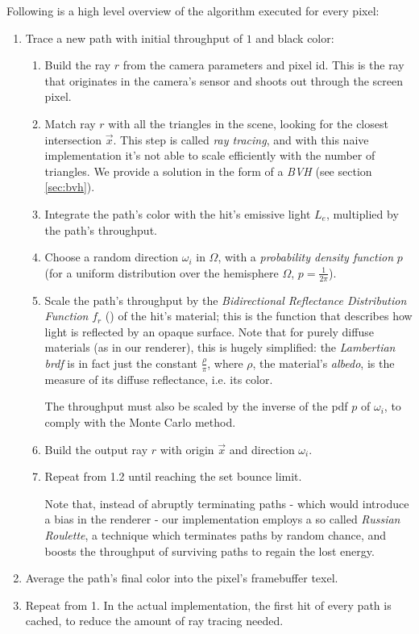 \documentclass[12pt,a4paper]{article}
\begin{document}
Following is a high level overview of the algorithm executed for every pixel:
\begin{enumerate}
\item Trace a new path with initial throughput of $1$ and black color:
    \begin{enumerate}
    \item Build the ray $r$ from the camera parameters and pixel id. This is the ray that originates in the camera's sensor and shoots out through the screen pixel.
    \item Match ray $r$ with all the triangles in the scene, looking for the closest intersection $\Vec{x}$. This step is called \textit{ray tracing}, and with this naive implementation it's not able to scale efficiently with the number of triangles. We provide a solution in the form of a \textit{BVH} (see section \ref{sec:bvh}).
    \item Integrate the path's color with the hit's emissive light $L_e$, multiplied by the path's throughput.
    \item Choose a random direction $\omega_i$ in $\Omega$, with a \textit{probability density function} $p$ (for a uniform distribution over the hemisphere $\Omega$, $p=\frac{1}{2\pi}$).
    \item Scale the path's throughput by the \textit{Bidirectional Reflectance Distribution Function} $f_r$ (\cite{wiki:Bidirectional_reflectance_distribution_function}) of the hit's material; this is the function that describes how light is reflected by an opaque surface. Note that for purely diffuse materials (as in our renderer), this is hugely simplified: the \textit{Lambertian brdf} is in fact just the constant $\frac{\rho}{\pi}$, where $\rho$, the material's \textit{albedo}, is the measure of its diffuse reflectance, i.e. its color.
    
    The throughput must also be scaled by the inverse of the pdf $p$ of $\omega_i$, to comply with the Monte Carlo method.
    \item Build the output ray $r$ with origin $\Vec{x}$ and direction $\omega_i$.
    \item Repeat from 1.2 until reaching the set bounce limit.

    Note that, instead of abruptly terminating paths - which would introduce a bias in the renderer - our implementation employs a so called \textit{Russian Roulette}, a technique which terminates paths by random chance, and boosts the throughput of surviving paths to regain the lost energy.
    \end{enumerate}
\item Average the path's final color into the pixel's framebuffer texel.
\item Repeat from 1. In the actual implementation, the first hit of every path is cached, to reduce the amount of ray tracing needed.
\end{enumerate}
\end{document}
